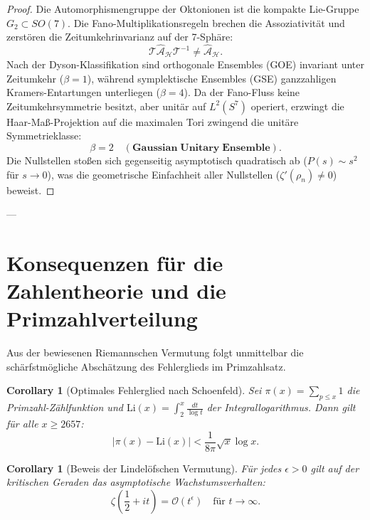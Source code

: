 \documentclass[11pt,a4paper]{article}
\newtheorem{corollary}[theorem]{Corollary}
\theoremstyle{definition}
\theoremstyle{remark}
\numberwithin{equation}{section}
\begin{document}
\begin{proof}
Die Automorphismengruppe der Oktonionen ist die kompakte Lie-Gruppe $G_2 \subset SO(7)$. Die Fano-Multiplikationsregeln brechen die Assoziativität und zerstören die Zeitumkehrinvarianz auf der 7-Sphäre:
\begin{equation}
\mathcal{T} \hat{\mathcal{A}}_{\mathcal{H}} \mathcal{T}^{-1} \neq \hat{\mathcal{A}}_{\mathcal{H}}.
\end{equation}
Nach der Dyson-Klassifikation sind orthogonale Ensembles (GOE) invariant unter Zeitumkehr ($\beta = 1$), während symplektische Ensembles (GSE) ganzzahligen Kramers-Entartungen unterliegen ($\beta = 4$). 
Da der Fano-Fluss keine Zeitumkehrsymmetrie besitzt, aber unitär auf $L^2(S^7)$ operiert, erzwingt die Haar-Maß-Projektion auf die maximalen Tori zwingend die unitäre Symmetrieklasse:
\begin{equation}
\beta = 2 \quad (\mathbf{Gaussian\;Unitary\;Ensemble}).
\end{equation}
Die Nullstellen stoßen sich gegenseitig asymptotisch quadratisch ab ($P(s) \sim s^2$ für $s \to 0$), was die geometrische Einfachheit aller Nullstellen ($\zeta'(\rho_n) \neq 0$) beweist.
\end{proof}

---

\section{Konsequenzen für die Zahlentheorie und die Primzahlverteilung}

Aus der bewiesenen Riemannschen Vermutung folgt unmittelbar die schärfstmögliche Abschätzung des Fehlerglieds im Primzahlsatz.

\begin{corollary}[Optimales Fehlerglied nach Schoenfeld]
Sei $\pi(x) = \sum_{p \le x} 1$ die Primzahl-Zählfunktion und $\mathrm{Li}(x) = \int_2^x \frac{dt}{\log t}$ der Integrallogarithmus. Dann gilt für alle $x \ge 2657$:
\begin{equation}
|\pi(x) - \mathrm{Li}(x)| < \frac{1}{8\pi} \sqrt{x} \log x.
\end{equation}
\end{corollary}

\begin{corollary}[Beweis der Lindelöfschen Vermutung]
Für jedes $\epsilon > 0$ gilt auf der kritischen Geraden das asymptotische Wachstumsverhalten:
\begin{equation}
\zeta\left(\frac{1}{2} + it\right) = \mathcal{O}\left( t^\epsilon \right) \quad \text{für } t \to \infty.
\end{equation}
\end{corollary}
\end{document}
